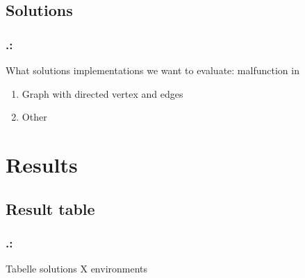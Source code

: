 \documentclass{beamer}
\begin{document}
\subsection{Solutions}

\begin{frame}
	\frametitle{\thesection.\thesubsection   \secname : \subsecname}
	What solutions implementations we want to evaluate:
	malfunction in 
	\begin{enumerate}
		\item{Graph with directed vertex and edges} 
		\item{Other} 
	\end{enumerate}
	
\end{frame}


\section{Results}

\subsection{Result table}
\begin{frame}
	\frametitle{\thesection.\thesubsection   \secname : \subsecname}
	Tabelle solutions X environments

\end{frame}
\end{document}
